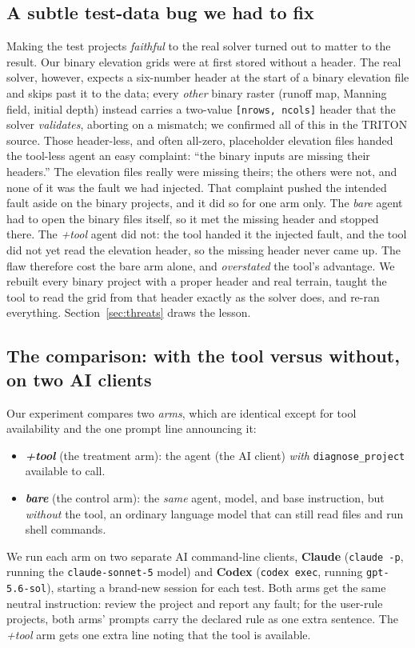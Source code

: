 \documentclass[conference]{IEEEtran}
\begin{document}
\subsection{A subtle test-data bug we had to fix}
\label{sec:fidelity}
Making the test projects \emph{faithful} to the real solver turned out to matter to the result.
Our binary elevation grids were at first stored without a header. The real solver, however,
expects a six-number header at the start of a binary elevation file and skips past it to the
data; every \emph{other}
binary raster (runoff map, Manning field, initial depth) instead carries a two-value
\texttt{[nrows,\,ncols]} header that the solver \emph{validates}, aborting on a mismatch; we
confirmed all of this in the TRITON source. Those
header-less, and often all-zero, placeholder elevation files handed the tool-less agent an easy
complaint: ``the binary inputs are missing their headers.'' The elevation files really were
missing theirs; the others were not, and none of it was the fault we had injected. That
complaint pushed the intended fault aside on the binary projects, and it did so for one arm only.
The \emph{bare} agent had to open the binary files itself, so it met the missing header and
stopped there. The \emph{+tool} agent did not: the tool handed it the injected fault, and the
tool did not yet read the elevation header, so the missing header never came up. The flaw
therefore cost the bare arm alone, and \emph{overstated} the tool's advantage. We
rebuilt every binary project with a proper header and real terrain, taught
the tool to read the grid from that header exactly as the solver does, and re-ran everything.
Section~\ref{sec:threats} draws the lesson.

\subsection{The comparison: with the tool versus without, on two AI clients}
Our experiment compares two \emph{arms}, which are identical except for tool availability and
the one prompt line announcing it:
\begin{itemize}
  \item \textbf{\emph{+tool}} (the treatment arm): the agent (the AI client) \emph{with}
        \texttt{diagnose\_project} available to call.
  \item \textbf{\emph{bare}} (the control arm): the \emph{same} agent, model, and base
        instruction, but \emph{without} the tool, an ordinary language model that can still read
        files and run shell commands.
\end{itemize}
We run each arm on two separate AI command-line clients, \textbf{Claude}
(\texttt{claude -p}, running the \texttt{claude-sonnet-5} model) and \textbf{Codex}
(\texttt{codex exec}, running \texttt{gpt-5.6-sol}), starting a brand-new session for each test. Both arms get the same neutral instruction: review the project and report any fault; for the
user-rule projects, both arms' prompts carry the declared rule as one extra sentence. The
\emph{+tool} arm gets one extra line noting that the tool is available.
\end{document}
